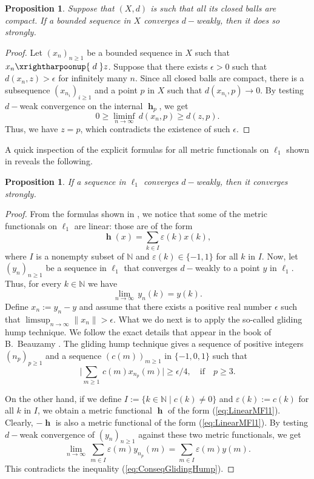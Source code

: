 \documentclass[a4paper,12pt]{article}
\newtheorem{prop}[thm]{Proposition}
\theoremstyle{definition}
\DeclareMathOperator{\h}{\mathbf{h}}
\newcommand{\norm}[1]{\lVert#1\rVert}
\newcommand{\N}{\mathbb{N}}
\numberwithin{equation}{section}
\begin{document}
\begin{prop}
Suppose that $(X,d)$ is such that all its closed balls are compact. If a bounded
sequence in $X$ converges $d-$weakly, then it does so strongly.
\end{prop}
\begin{proof}
Let $(x_n)_{n\geq 1}$ be a bounded sequence in $X$ such that 
$x_n \xrightharpoonup{\;d\;} z$. Suppose that there exists $\epsilon>0$ such that 
$d(x_n,z)>\epsilon$ for infinitely many $n$. Since all closed balls are compact, 
there is a subsequence $(x_{n_i})_{i\geq 1}$ and a point $p$ in $X$ such that 
$d(x_{n_i},p) \rightarrow 0$. By testing $d-$weak convergence on the internal 
$\h_p$, we get
$$
0\geq \liminf_{n\to\infty}\,d(x_n,p) \geq d(z,p).
$$
Thus, we have $z=p$, which contradicts the existence of such $\epsilon$.
\end{proof}

A quick inspection of the explicit formulas for all metric functionals on 
$\ell_1$ shown in \cite[Theorem~3.6]{Gutierrez2019-2} reveals the following.

\begin{prop}\label{prop:dWeakStrongl1}
If a sequence in $\ell_1$ converges $d-$weakly, then it converges strongly. 
\end{prop}

\begin{proof}
From the formulas shown in \cite[Theorem~3.6]{Gutierrez2019-2}, we notice that 
some of the metric functionals on $\ell_1$ are linear: those are of the form
\begin{equation}\label{eq:LinearMFl1}
	\h(x) = \sum_{k\in I}\varepsilon(k) x(k),
\end{equation}
where $I$ is a nonempty subset of $\N$ and $\varepsilon(k)\in\{-1,1\}$ for all 
$k$ in $I$. Now, let $(y_n)_{n\geq 1}$ be a sequence in $\ell_1$ that converges
$d-$weakly to a point $y$ in $\ell_1$. Thus, for every $k\in \N$ we 
have 
$$
	\lim_{n\to\infty}\,y_n(k) = y(k).
$$
Define $x_n := y_n - y$ and assume that there exists a positive real number 
$\epsilon$ such that $\limsup_{n\to\infty}\norm{x_n} > \epsilon$. What we do next 
is to apply the so-called gliding hump technique. We follow the exact details 
that appear in the book of B.~Beauzamy \cite[pp.~117-118]{Beauzamy1982}.
The gliding hump technique gives a sequence of positive integers 
$(n_p)_{p \geq 1}$ and a sequence $(c(m))_{m\geq 1}$ in $\{-1,0,1\}$ such that
\begin{equation}\label{eq:ConseqGlidingHump}
	\Big|\sum_{m\geq 1}\,c(m)x_{n_p}(m)\Big| 
	\geq \epsilon / 4,\quad\text{if}\quad p\geq 3.
\end{equation}

On the other hand, if we define $I:=\{k\in\N \mid c(k)\neq 0\}$ and 
$\varepsilon(k):=c(k)$ for all $k$ in $I$, we obtain a metric functional $\h$ of 
the form (\ref{eq:LinearMFl1}). Clearly, $-\h$ is also a metric functional of 
the form (\ref{eq:LinearMFl1}). By testing $d-$weak convergence of 
$(y_n)_{n\geq 1}$ against these two metric functionals, we get
$$
	\lim_{n\to\infty}\,\sum_{m\in I}\varepsilon(m)y_{n_p}(m) 
	= \sum_{m\in I}\varepsilon(m)y(m).
$$
This contradicts the inequality (\ref{eq:ConseqGlidingHump}). 
\end{proof}
\end{document}
